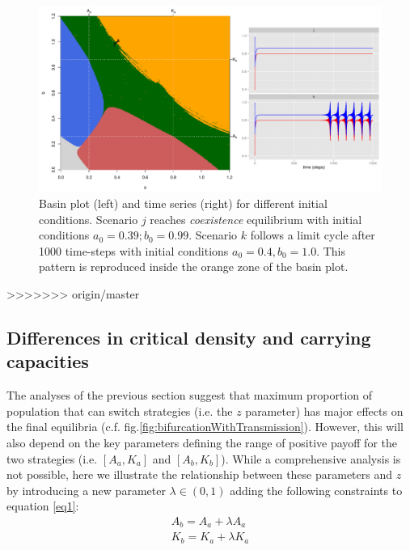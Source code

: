 \documentclass[3p,authoryear,twocolumn]{elsarticle} %
\begin{document}
\begin{figure}[h!]
  \centering
      \includegraphics[width=\textwidth]{./figures/figureUnstable}   
      \caption{Basin plot (left) and time series (right) for different initial conditions. Scenario $j$ reaches \emph{coexistence} equilibrium with initial conditions $a_0=0.39; b_0=0.99$. Scenario $k$ follows a limit cycle after 1000 time-steps with initial conditions $a_0=0.4,b_0=1.0$. This pattern is reproduced inside the orange zone of the basin plot.}
    \label{fig:unstable}
\end{figure}
>>>>>>> origin/master



\subsection{Differences in critical density and carrying capacities}

The analyses of the previous section suggest that maximum proportion of population that can switch strategies (i.e. the $z$ parameter) has major effects on the final equilibria (c.f. fig.\ref{fig:bifurcationWithTransmission}). However, this will also depend on the key parameters defining the range of positive payoff for the two strategies (i.e. $[A_a,K_a]$ and $[A_b,K_b]$). While a comprehensive analysis is not possible, here we illustrate the relationship between these parameters and $z$ by introducing a new parameter $\lambda \in (0,1)$ adding the following constraints to equation \eqref{eq1}: 
\begin{equation}
\begin{aligned}
\label{eqOverlap}
A_b = A_a + \lambda A_a\\
K_b = K_a + \lambda K_a
\end{aligned}
\end{equation}
\end{document}
